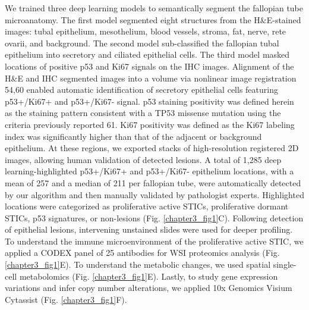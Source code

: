 \begin{refsection}
    We trained three deep learning models to semantically segment the fallopian tube microanatomy. The first model segmented eight structures from the H\&E-stained images: tubal epithelium, mesothelium, blood vessels, stroma, fat, nerve, rete ovarii, and background. The second model sub-classified the fallopian tubal epithelium into secretory and ciliated epithelial cells. The third model masked locations of positive p53 and Ki67 signals on the IHC images. Alignment of the H\&E and IHC segmented images into a volume via nonlinear image registration\cite{Kiemen2022CODA,Forjaz2025PIVOT} 54,60 enabled automatic identification of secretory epithelial cells featuring p53+/Ki67+ and p53+/Ki67- signal. p53 staining positivity was defined herein as the staining pattern consistent with a TP53 missense mutation using the criteria previously reported\cite{Yemelyanova2011Immunohistochemical} 61. Ki67 positivity was defined as the Ki67 labeling index was significantly higher than that of the adjacent or background epithelium. At these regions, we exported stacks of high-resolution registered 2D images, allowing human validation of detected lesions. A total of 1,285 deep learning-highlighted p53+/Ki67+ and p53+/Ki67- epithelium locations, with a mean of 257 and a median of 211 per fallopian tube, were automatically detected by our algorithm and then manually validated by pathologist experts. Highlighted locations were categorized as proliferative active STICs, proliferative dormant STICs, p53 signatures, or non-lesions (Fig. \ref{chapter3_fig1}C). 
    Following detection of epithelial lesions, intervening unstained slides were used for deeper profiling. To understand the immune microenvironment of the proliferative active STIC, we applied a CODEX panel of 25 antibodies for WSI proteomics analysis (Fig. \ref{chapter3_fig1}E). To understand the metabolic changes, we used spatial single-cell metabolomics (Fig. \ref{chapter3_fig1}E). Lastly, to study gene expression variations and infer copy number alterations, we applied 10x Genomics Visium Cytassist (Fig. \ref{chapter3_fig1}F).
    

\end{refsection}
